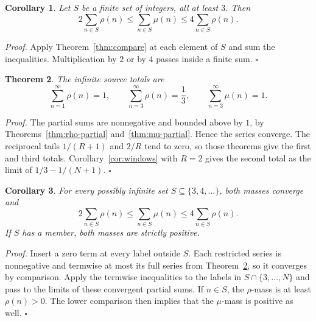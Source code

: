 \documentclass[11pt,letterpaper]{article}
\newtheorem{theorem}{Theorem}
\newtheorem{corollary}[theorem]{Corollary}
\newenvironment{proof}{\noindent\textit{Proof.}}{\hfill\(\square\)}
\begin{document}
\begin{corollary}
\label{cor:finite}
Let $S$ be a finite set of integers, all at least $3$. Then
\begin{equation*}
2\sum_{n\in S}\rho(n)\le\sum_{n\in S}\mu(n)\le 4\sum_{n\in S}\rho(n).
\end{equation*}
\end{corollary}

\begin{proof}
Apply Theorem~\ref{thm:compare} at each element of $S$ and sum the inequalities. Multiplication by $2$ or by $4$ passes inside a finite sum.
\end{proof}

\begin{theorem}
\label{thm:source-totals}
The infinite source totals are
\begin{equation*}
\sum_{n=1}^{\infty}\rho(n)=1,\qquad
\sum_{n=3}^{\infty}\rho(n)=\frac13,\qquad
\sum_{n=3}^{\infty}\mu(n)=1.
\end{equation*}
\end{theorem}

\begin{proof}
The partial sums are nonnegative and bounded above by $1$, by Theorems~\ref{thm:rho-partial} and~\ref{thm:mu-partial}. Hence the series converge. The reciprocal tails $1/(R+1)$ and $2/R$ tend to zero, so those theorems give the first and third totals. Corollary~\ref{cor:windows} with $R=2$ gives the second total as the limit of $1/3-1/(N+1)$.
\end{proof}

\begin{corollary}
\label{cor:infinite}
For every possibly infinite set $S\subseteq\{3,4,\ldots\}$, both masses converge and
\begin{equation*}
2\sum_{n\in S}\rho(n)\le\sum_{n\in S}\mu(n)
\le4\sum_{n\in S}\rho(n).
\end{equation*}
If $S$ has a member, both masses are strictly positive.
\end{corollary}

\begin{proof}
Insert a zero term at every label outside $S$. Each restricted series is nonnegative and termwise at most its full series from Theorem~\ref{thm:source-totals}, so it converges by comparison. Apply the termwise inequalities to the labels in $S\cap\{3,\ldots,N\}$ and pass to the limits of these convergent partial sums. If $n\in S$, the $\rho$-mass is at least $\rho(n)>0$. The lower comparison then implies that the $\mu$-mass is positive as well.
\end{proof}
\end{document}
